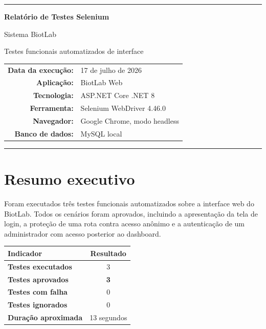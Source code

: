 \documentclass[12pt,a4paper]{article}
\begin{document}
\begin{titlepage}
  \centering
  \vspace*{2.5cm}
  {\color{biotblue}\rule{\textwidth}{2pt}\par}
  \vspace{1.2cm}
  {\Huge\bfseries Relatório de Testes Selenium\par}
  \vspace{0.5cm}
  {\LARGE Sistema BiotLab\par}
  \vspace{1.5cm}
  {\large Testes funcionais automatizados de interface\par}
  \vfill
  \begin{tabular}{rl}
    \textbf{Data da execução:} & 17 de julho de 2026 \\
    \textbf{Aplicação:} & BiotLab Web \\
    \textbf{Tecnologia:} & ASP.NET Core .NET 8 \\
    \textbf{Ferramenta:} & Selenium WebDriver 4.46.0 \\
    \textbf{Navegador:} & Google Chrome, modo headless \\
    \textbf{Banco de dados:} & MySQL local \\
  \end{tabular}
  \vfill
  {\color{biotblue}\rule{\textwidth}{2pt}\par}
\end{titlepage}

\tableofcontents
\newpage

\section{Resumo executivo}

Foram executados três testes funcionais automatizados sobre a interface web do
BiotLab. Todos os cenários foram aprovados, incluindo a apresentação da tela de
login, a proteção de uma rota contra acesso anônimo e a autenticação de um
administrador com acesso posterior ao dashboard.

\begin{center}
  \setlength{\tabcolsep}{12pt}
  \renewcommand{\arraystretch}{1.4}
  \begin{tabular}{>{\bfseries}l c}
    \toprule
    Indicador & Resultado \\
    \midrule
    Testes executados & 3 \\
    Testes aprovados & \textcolor{successgreen}{\textbf{3}} \\
    Testes com falha & 0 \\
    Testes ignorados & 0 \\
    Duração aproximada & 13 segundos \\
    \bottomrule
  \end{tabular}
\end{center}
\end{document}
